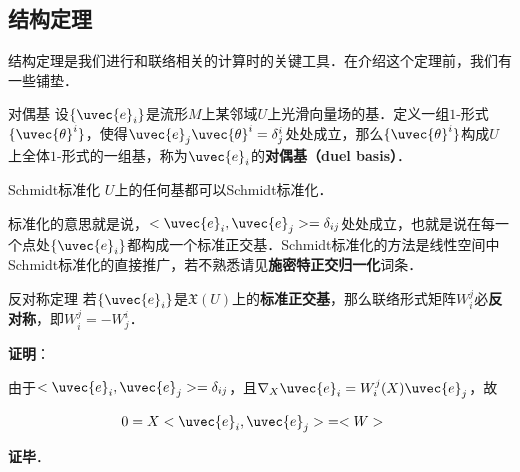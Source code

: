 \subsection{结构定理}

结构定理是我们进行和联络相关的计算时的关键工具．在介绍这个定理前，我们有一些铺垫．

\begin{definition}{对偶基}
设$\{\uvec{e}_i\}$是流形$M$上某邻域$U$上光滑向量场的基．定义一组$1$-形式$\{\uvec{\theta}^i\}$，使得$\uvec{e}_j\uvec{\theta}^i=\delta^i_j$处处成立，那么$\{\uvec{\theta}^i\}$构成$U$上全体$1$-形式的一组基，称为$\uvec{e}_i$的\textbf{对偶基（duel basis）}．
\end{definition}

\begin{theorem}{Schmidt标准化}
$U$上的任何基都可以Schmidt标准化．
\end{theorem}

标准化的意思就是说，$<\uvec{e}_i, \uvec{e}_j>=\delta_{ij}$处处成立，也就是说在每一个点处$\{\uvec{e}_i\}$都构成一个标准正交基．Schmidt标准化的方法是线性空间中Schmidt标准化的直接推广，若不熟悉请见\textbf{施密特正交归一化}词条．

\begin{theorem}{反对称定理}
若$\{\uvec{e}_i\}$是$\mathfrak{X}(U)$上的\textbf{标准正交基}，那么联络形式矩阵$W^j_i$必\textbf{反对称}，即$W^j_i=-W^i_j$．
\end{theorem}

\textbf{证明}：

由于$<\uvec{e}_i, \uvec{e}_j>=\delta_{ij}$，且$\nabla_X\uvec{e}_i=W^j_i(X)\uvec{e}_j$，故

\begin{equation}
\begin{aligned}
0=X<\uvec{e}_i, \uvec{e}_j>&=<W>
\end{aligned}
\end{equation}

\textbf{证毕}．















